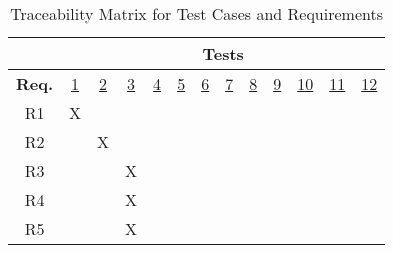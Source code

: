 \documentclass[12pt, titlepage]{article}
\begin{document}
\begin{table}[H]
    \centering
    \caption{Traceability Matrix for Test Cases and Requirements}
    \begin{tabular}{|c|cccccccccccc|}
\hline
 & \multicolumn{12}{c|}{\textbf{Tests}} \\
\hline
\textbf{Req.} & \multicolumn{1}{c|}{\hyperref[test-1]{1}} & \multicolumn{1}{c|}{\hyperref[test-2]{2}} & \multicolumn{1}{c|}{\hyperref[test-3]{3}}
& \multicolumn{1}{c|}{\hyperref[test-4]{4}} & \multicolumn{1}{c|}{\hyperref[test-5]{5}} & \multicolumn{1}{c|}{\hyperref[test-6]{6}}
& \multicolumn{1}{c|}{\hyperref[test-7]{7}} & \multicolumn{1}{c|}{\hyperref[test-8]{8}} & \multicolumn{1}{c|}{\hyperref[test-9]{9}}
& \multicolumn{1}{c|}{\hyperref[test-10]{10}} & \multicolumn{1}{c|}{\hyperref[test-11]{11}} & \hyperref[test-12]{12} \\ \hline

R1 & \multicolumn{1}{c|}{X}  & \multicolumn{1}{c|}{}  & \multicolumn{1}{c|}{}
& \multicolumn{1}{c|}{}  & \multicolumn{1}{c|}{}  & \multicolumn{1}{c|}{}
& \multicolumn{1}{c|}{}  & \multicolumn{1}{c|}{}  & \multicolumn{1}{c|}{}
& \multicolumn{1}{c|}{}   & \multicolumn{1}{c|}{}   &    \\ \hline

R2 & \multicolumn{1}{c|}{}  & \multicolumn{1}{c|}{X}  & \multicolumn{1}{c|}{}
& \multicolumn{1}{c|}{}  & \multicolumn{1}{c|}{}  & \multicolumn{1}{c|}{}
& \multicolumn{1}{c|}{}  & \multicolumn{1}{c|}{}  & \multicolumn{1}{c|}{}
& \multicolumn{1}{c|}{}   & \multicolumn{1}{c|}{}   &    \\ \hline

R3 & \multicolumn{1}{c|}{}  & \multicolumn{1}{c|}{}  & \multicolumn{1}{c|}{X}
& \multicolumn{1}{c|}{}  & \multicolumn{1}{c|}{}  & \multicolumn{1}{c|}{}
& \multicolumn{1}{c|}{}  & \multicolumn{1}{c|}{}  & \multicolumn{1}{c|}{}
& \multicolumn{1}{c|}{}   & \multicolumn{1}{c|}{}   &    \\ \hline

R4 & \multicolumn{1}{c|}{}  & \multicolumn{1}{c|}{}  & \multicolumn{1}{c|}{X}
& \multicolumn{1}{c|}{}  & \multicolumn{1}{c|}{}  & \multicolumn{1}{c|}{}
& \multicolumn{1}{c|}{}  & \multicolumn{1}{c|}{}  & \multicolumn{1}{c|}{}
& \multicolumn{1}{c|}{}   & \multicolumn{1}{c|}{}   &    \\ \hline

R5 & \multicolumn{1}{c|}{}  & \multicolumn{1}{c|}{}  & \multicolumn{1}{c|}{X}
& \multicolumn{1}{c|}{}  & \multicolumn{1}{c|}{}  & \multicolumn{1}{c|}{}
& \multicolumn{1}{c|}{}  & \multicolumn{1}{c|}{}  & \multicolumn{1}{c|}{}
& \multicolumn{1}{c|}{}   & \multicolumn{1}{c|}{}   &    \\ \hline


\end{tabular}
\end{table}
\end{document}
